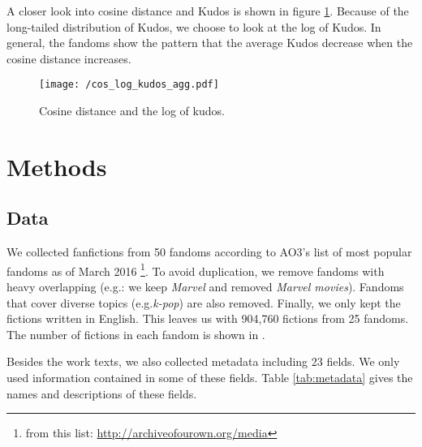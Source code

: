 \documentclass[a4paper]{article}
\begin{document}
A closer look into cosine distance and Kudos is shown in figure \ref{fig:cos_kudos}. Because of the long-tailed distribution of Kudos, we choose to look at the log of Kudos. In general, the fandoms show the pattern that the average Kudos decrease when the cosine distance increases.


\begin{figure}[htbp]
\begin{center}
\texttt{[image: /cos\_log\_kudos\_agg.pdf]}
\caption{Cosine distance and the log of kudos.}
\label{fig:cos_kudos}
\end{center}
\end{figure}







\section{Methods} %
\label{sec:methods}


\subsection{Data}
We collected fanfictions from 50 fandoms according to AO3's list of most popular fandoms as of March 2016 \footnote{from this list: \url{http://archiveofourown.org/media}}. To avoid duplication, we remove fandoms with heavy overlapping (e.g.: we keep \emph{Marvel} and removed \emph{Marvel movies}). Fandoms that cover diverse topics (e.g.\emph{k-pop}) are also removed. Finally, we only kept the fictions written in English. This leaves us with 904,760 fictions from 25 fandoms. The number of fictions in each fandom is shown in .



Besides the work texts, we also collected metadata including 23 fields. We only used information contained in some of these fields. Table \ref{tab:metadata} gives the names and descriptions of these fields. 
\end{document}
